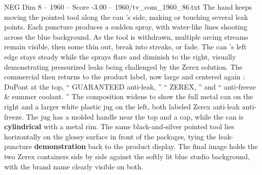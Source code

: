 \begin{textsample}{NEG Dim 8 – 1960 – Score -3.00 – 1960/tv\_com\_1960\_86.txt}
The hand keeps moving the pointed tool along the can ’s side, making or touching several leak points.
Each puncture produces a sudden spray, with water-like lines shooting across the blue background.
As the tool is withdrawn, multiple arcing streams remain visible, then some thin out, break into streaks, or fade.
The can ’s left edge stays steady while the sprays flare and diminish to the right, visually demonstrating pressurized leaks being challenged by the Zerex solution.
The commercial then returns to the product label, now large and centered again : DuPont at the top, “ GUARANTEED anti-leak, ” “ ZEREX, ” and “ anti-freeze \& summer coolant. ” The composition widens to show the full metal can on the right and a larger white plastic jug on the left, both labeled Zerex anti-leak anti-freeze.
The jug has a molded handle near the top and a cap, while the can is \textbf{cylindrical} with a metal rim.
The same black-and-silver pointed tool lies horizontally on the glossy surface in front of the packages, tying the leak-puncture \textbf{demonstration} back to the product display.
The final image holds the two Zerex containers side by side against the softly lit blue studio background, with the brand name clearly visible on both.

\end{textsample}
